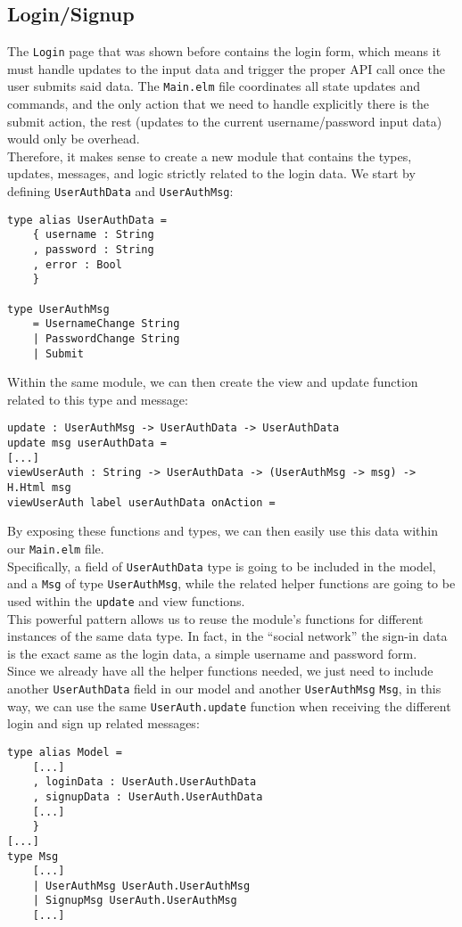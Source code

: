 \subsection{Login/Signup}

The \texttt{Login} page that was shown before contains the login form, which means it must handle updates to the input data and trigger the proper API call once the user submits said data. The \texttt{Main.elm} file coordinates all state updates and commands, and the only action that we need to handle explicitly there is the submit action, the rest (updates to the current username/password input data) would only be overhead.\\
Therefore, it makes sense to create a new module that contains the types, updates, messages, and logic strictly related to the login data. We start by defining \texttt{UserAuthData} and \texttt{UserAuthMsg}:
\begin{verbatim}
type alias UserAuthData =
    { username : String
    , password : String
    , error : Bool
    }

type UserAuthMsg
    = UsernameChange String
    | PasswordChange String
    | Submit
\end{verbatim}

Within the same module, we can then create the view and update function related to this type and message:
\begin{verbatim}
update : UserAuthMsg -> UserAuthData -> UserAuthData
update msg userAuthData =
[...]
viewUserAuth : String -> UserAuthData -> (UserAuthMsg -> msg) -> H.Html msg
viewUserAuth label userAuthData onAction =
\end{verbatim}

By exposing these functions and types, we can then easily use this data within our \texttt{Main.elm} file.\\
Specifically, a field of \texttt{UserAuthData} type is going to be included in the model, and a \texttt{Msg} of type \texttt{UserAuthMsg}, while the related helper functions are going to be used within the \texttt{update} and view functions.\\

This powerful pattern allows us to reuse the module's functions for different instances of the same data type. In fact, in the ``social network'' the sign-in data is the exact same as the login data, a simple username and password form.\\ Since we already have all the helper functions needed, we just need to include another \texttt{UserAuthData} field in our model and another \texttt{UserAuthMsg}  \texttt{Msg}, in this way, we can use the same \texttt{UserAuth.update} function when receiving the different login and sign up related messages:
\begin{verbatim}  
type alias Model =
    [...]
    , loginData : UserAuth.UserAuthData
    , signupData : UserAuth.UserAuthData
    [...]
    }
[...]
type Msg
    [...]
    | UserAuthMsg UserAuth.UserAuthMsg
    | SignupMsg UserAuth.UserAuthMsg
    [...]
\end{verbatim}

